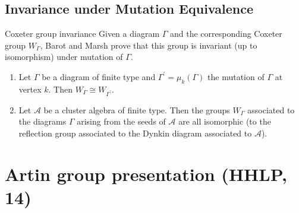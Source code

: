 \documentclass{beamer}
\begin{document}
\subsection{Invariance under Mutation Equivalence}

\begin{frame}{Coxeter group invariance}
Given a diagram $\Gamma$ and the corresponding Coxeter group $W_{\Gamma}$, Barot and Marsh prove that this group is invariant (up to isomorphism) under mutation of $\Gamma$.

\begin{theorem}
\begin{enumerate}
\item Let $\Gamma$ be a diagram of finite type and $\Gamma^{\prime} = \mu_k(\Gamma)$ the mutation of $\Gamma$ at vertex $k$. Then $W_{\Gamma} \cong W_{\Gamma^{\prime}}$.
\item Let $\mathscr{A}$ be a cluster algebra of finite type. Then the groups $W_{\Gamma}$ associated to the diagrams $\Gamma$ arising from the seeds of $\mathscr{A}$ are all isomorphic (to the reflection group associated to the Dynkin diagram associated to $\mathscr{A}$).
\end{enumerate}
\end{theorem}
\end{frame}


\section{Artin group presentation (HHLP, 14)}
\end{document}
